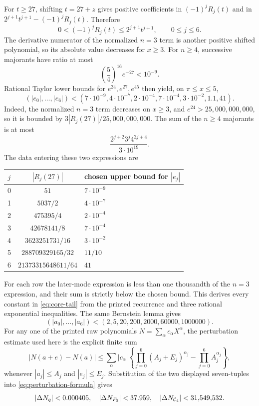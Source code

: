 For \(t\geq27\), shifting \(t=27+z\) gives positive coefficients in
\((-1)^jR_j(t)\) and in
\(2^{j+1}t^{j+1}-(-1)^jR_j(t)\). Therefore
\begin{equation}\label{eq:R-envelope}
 0<(-1)^jR_j(t)\leq2^{j+1}t^{j+1},
 \qquad 0\leq j\leq6.
\end{equation}
The derivative numerator of the normalized \(n=3\) term is another positive
shifted polynomial, so its absolute value decreases for \(x\geq3\). For
\(n\geq4\), successive majorants have ratio at most
\[
 \left(\frac54\right)^{16}e^{-27}<10^{-9}.
\]
Rational Taylor lower bounds for \(e^{24},e^{27},e^{45}\) then yield, on
\(\pi\leq x\leq5\),
\begin{equation}\label{eq:core-tail}
(|e_0|,\ldots,|e_6|)<
(7\!\cdot\!10^{-9},4\!\cdot\!10^{-7},2\!\cdot\!10^{-4},
7\!\cdot\!10^{-4},3\!\cdot\!10^{-2},1.1,41).
\end{equation}
Indeed, the normalized \(n=3\) term decreases on \(x\geq3\), and
\(e^{24}>25{,}000{,}000{,}000\), so it is bounded by
\(3|R_j(27)|/25{,}000{,}000{,}000\). The sum of the \(n\geq4\) majorants is
at most
\[
 \frac{2^{j+2}3^j4^{2j+4}}{3\cdot10^{19}}.
\]
The data entering these two expressions are
\begin{center}
\small
\begin{tabular}{@{}ccl@{}}
\toprule
\(j\) & \( |R_j(27)| \) & chosen upper bound for \( |e_j| \)\\
\midrule
0 & \(51\) & \(7\cdot10^{-9}\)\\
1 & \(5037/2\) & \(4\cdot10^{-7}\)\\
2 & \(475395/4\) & \(2\cdot10^{-4}\)\\
3 & \(42678141/8\) & \(7\cdot10^{-4}\)\\
4 & \(3623251731/16\) & \(3\cdot10^{-2}\)\\
5 & \(288709329165/32\) & \(11/10\)\\
6 & \(21373315648611/64\) & \(41\)\\
\bottomrule
\end{tabular}
\end{center}
For each row the later-mode expression is less than one thousandth of the
\(n=3\) expression, and their sum is strictly below the chosen bound. This
derives every constant in \eqref{eq:core-tail} from the printed recurrence and
three rational exponential inequalities.
The same Bernstein lemma gives
\[
(|a_0|,\ldots,|a_6|)<(2,5,20,200,2000,60000,1000000).
\]
For any one of the printed raw polynomials
\(N=\sum_\alpha c_\alpha X^\alpha\), the perturbation estimate used here is
the explicit finite sum
\begin{equation}\label{eq:perturbation-formula}
 |N(a+e)-N(a)|
 \leq\sum_\alpha |c_\alpha|
 \left\{\prod_{j=0}^6(A_j+E_j)^{\alpha_j}
              -\prod_{j=0}^6A_j^{\alpha_j}\right\},
\end{equation}
whenever \(|a_j|\leq A_j\) and \(|e_j|\leq E_j\). Substitution of the two
displayed seven-tuples into \eqref{eq:perturbation-formula} gives
\begin{equation}\label{eq:core-perturbation}
 |\Delta N_q|<0.000405,\quad
 |\Delta N_{F_2}|<37.959,\quad
 |\Delta N_{\mathcal{C}_4}|<31{,}549{,}532.
\end{equation}

